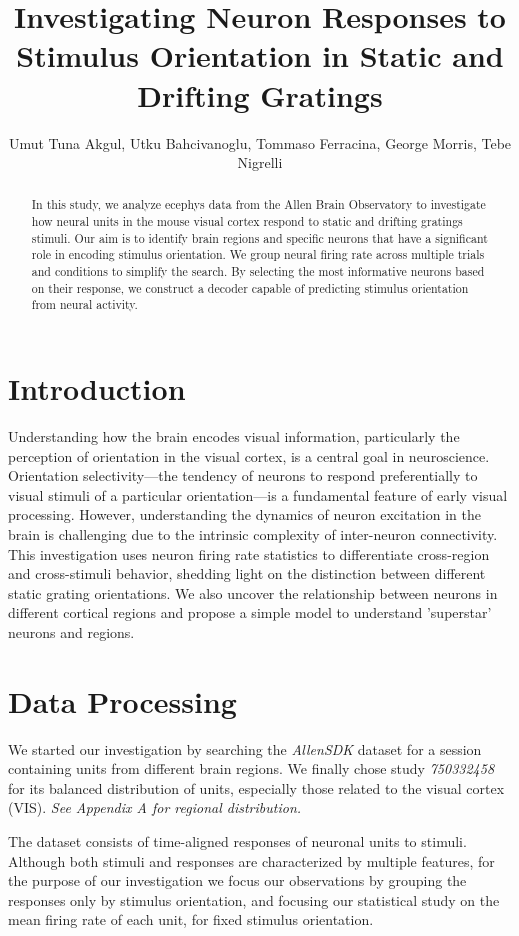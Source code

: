 \documentclass[10pt,twocolumn]{article}
\title{\Large \textbf{Investigating Neuron Responses to Stimulus Orientation in Static and Drifting Gratings}}
\author{
  Umut Tuna Akgul, Utku Bahcivanoglu, Tommaso Ferracina, George Morris, Tebe Nigrelli
}
\begin{document}
\maketitle

\begin{abstract}
In this study, we analyze ecephys data from the Allen Brain Observatory to investigate how neural units in the mouse visual cortex respond to static and drifting gratings stimuli. Our aim is to identify brain regions and specific neurons that have a significant role in encoding stimulus orientation. We group neural firing rate across multiple trials and conditions to simplify the search. By selecting the most informative neurons based on their response, we construct a decoder capable of predicting stimulus orientation from neural activity.
\end{abstract}

\section{Introduction}

Understanding how the brain encodes visual information, particularly the perception of orientation in the visual cortex, is a central goal in neuroscience. Orientation selectivity—the tendency of neurons to respond preferentially to visual stimuli of a particular orientation—is a fundamental feature of early visual processing. However, understanding the dynamics of neuron excitation in the brain is challenging due to the intrinsic complexity of inter-neuron connectivity. This investigation uses neuron firing rate statistics to differentiate cross-region and cross-stimuli behavior, shedding light on the distinction between different static grating orientations. We also uncover the relationship between neurons in different cortical regions and propose a simple model to understand 'superstar' neurons and regions.

\section{Data Processing}

We started our investigation by searching the \textit{AllenSDK} dataset for a session containing units from different brain regions. We finally chose study \textit{750332458} for its balanced distribution of units, especially those related to the visual cortex (VIS). \textit{See Appendix A for regional distribution.}

The dataset consists of time-aligned responses of neuronal units to stimuli. Although both stimuli and responses are characterized by multiple features, for the purpose of our investigation we focus our observations by grouping the responses only by stimulus orientation, and focusing our statistical study on the mean firing rate of each unit, for fixed stimulus orientation.
\end{document}

